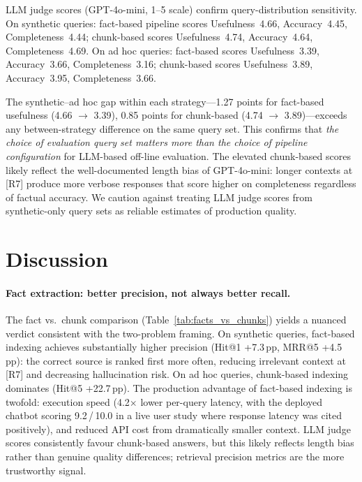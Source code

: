 \documentclass[sigconf,natbib=true]{acmart}
\begin{document}
LLM judge scores (GPT-4o-mini, 1--5 scale) confirm query-distribution sensitivity.
On synthetic queries: fact-based pipeline scores Usefulness~4.66, Accuracy~4.45, Completeness~4.44; chunk-based scores Usefulness~4.74, Accuracy~4.64, Completeness~4.69.
On ad hoc queries: fact-based scores Usefulness~3.39, Accuracy~3.66, Completeness~3.16; chunk-based scores Usefulness~3.89, Accuracy~3.95, Completeness~3.66.

The synthetic--ad hoc gap within each strategy---1.27 points for fact-based usefulness (4.66 $\to$ 3.39), 0.85 points for chunk-based (4.74 $\to$ 3.89)---exceeds any between-strategy difference on the same query set.
This confirms that \emph{the choice of evaluation query set matters more than the choice of pipeline configuration} for LLM-based off-line evaluation.
The elevated chunk-based scores likely reflect the well-documented length bias of GPT-4o-mini: longer contexts at [R7] produce more verbose responses that score higher on completeness regardless of factual accuracy.
We caution against treating LLM judge scores from synthetic-only query sets as reliable estimates of production quality.

\section{Discussion}
\label{sec:discussion}

\paragraph{Fact extraction: better precision, not always better recall.}
The fact vs.\ chunk comparison (Table~\ref{tab:facts_vs_chunks}) yields a nuanced verdict consistent with the two-problem framing.
On synthetic queries, fact-based indexing achieves substantially higher precision (Hit@1 +7.3\,pp, MRR@5 +4.5\,pp): the correct source is ranked first more often, reducing irrelevant context at [R7] and decreasing hallucination risk.
On ad hoc queries, chunk-based indexing dominates (Hit@5 +22.7\,pp).
The production advantage of fact-based indexing is twofold: execution speed (4.2$\times$ lower per-query latency, with the deployed chatbot scoring 9.2\,/\,10.0 in a live user study where response latency was cited positively), and reduced API cost from dramatically smaller context.
LLM judge scores consistently favour chunk-based answers, but this likely reflects length bias rather than genuine quality differences; retrieval precision metrics are the more trustworthy signal.
\end{document}
